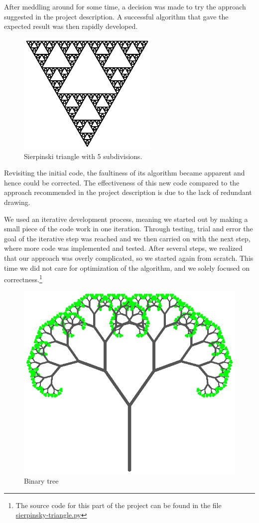 \documentclass[titlepage]{article}
\begin{document}
After meddling around for some time, a decision was made to try the approach suggested in the project description. A successful algorithm that gave the expected result was then rapidly developed.
\begin{figure}[H]
  \includegraphics[width=0.6\textwidth]{triangle}
  \caption{Sierpinski triangle with 5 subdivisions.}
\end{figure}
Revisiting the initial code, the faultiness of its algorithm became apparent and hence could be corrected. The effectiveness of this new code compared to the approach recommended in the project description is due to the lack of redundant drawing. \par We used an iterative development process, meaning we started out by making a small piece of the code work in one iteration. Through testing, trial and error the goal of the iterative step was reached and we then carried on with the next step, where more code was implemented and tested. After several steps, we realized that our approach was overly complicated, so we started again from scratch. This time we did not care for optimization of the algorithm, and we solely focused on correctness.\footnote{The source code for this part of the project can be found in the file \href{https://github.com/ErikAndersen81/DM550-FractalProject/blob/master/sierpinsky-triangle.py}{sierpinsky-triangle.py}}
\begin{figure}[H]
  \centering
  \includegraphics{bintree}
  \caption{Binary tree}
\end{figure}
\end{document}

